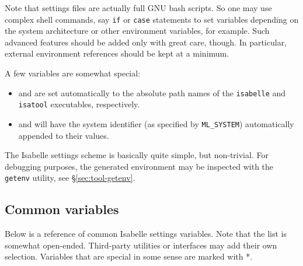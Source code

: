 Note that settings files are actually full GNU bash scripts. So one
may use complex shell commands, say \texttt{if} or \texttt{case}
statements to set variables depending on the system architecture or
other environment variables, for example. Such advanced features
should be added only with great care, though. In particular, external
environment references should be kept at a minimum.

\medskip A few variables are somewhat special:
\begin{itemize}
\item {} and  are set automatically to
  the absolute path names of the \texttt{isabelle} and
  \texttt{isatool} executables, respectively.
  
\item {} and  will have
  the {\ML} system identifier (as specified by \texttt{ML_SYSTEM})
  automatically appended to their values.
\end{itemize}

\medskip The Isabelle settings scheme is basically quite simple, but
non-trivial.  For debugging purposes, the generated environment may be
inspected with the \texttt{getenv} utility, see
\S\ref{sec:tool-getenv}.


\subsection{Common variables}

Below is a reference of common Isabelle settings variables. Note that
the list is somewhat open-ended. Third-party utilities or interfaces
may add their own selection. Variables that are special in some sense
are marked with *.

